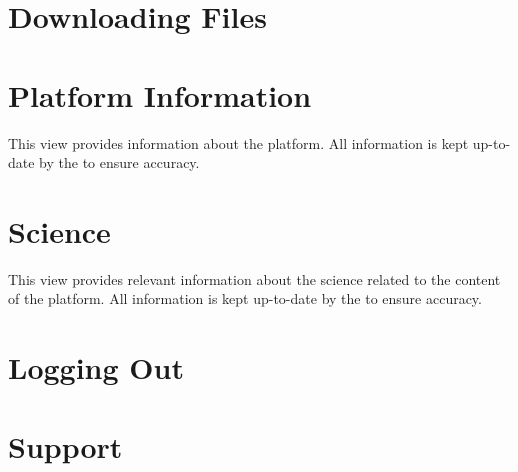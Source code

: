 \chapter{Downloading Files} \label{chap:user-download-files} 



\chapter{Platform Information} \label{chap:user-platform-info} 

This view provides information about the platform. All information is kept up-to-date by the \admin to ensure accuracy.



\chapter{Science} \label{chap:user-science} 

This view provides relevant information about the science related to the content of the platform. All information is kept up-to-date by the \admin to ensure accuracy.



\chapter{Logging Out} \label{chap:user-logout}



\chapter{Support} \label{chap:user-support}



